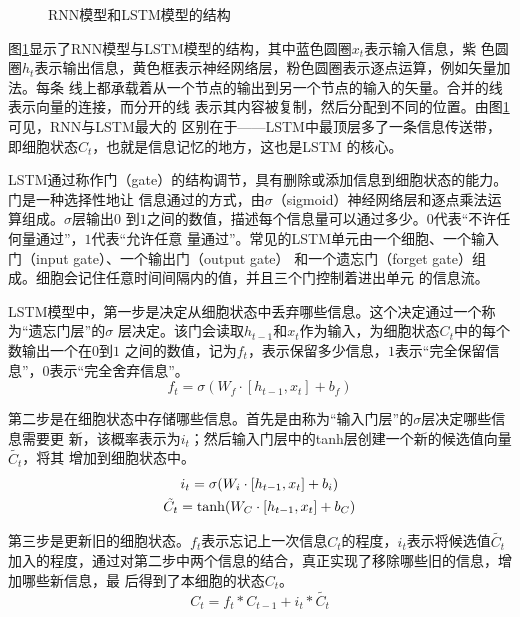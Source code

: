 \documentclass[lang=cn,11pt,a4paper,cite=authoryear]{elegantpaper}
\begin{document}
\begin{figure}[htp]
	\centering
    \caption{RNN模型和LSTM模型的结构}
	\label{fig:structure}
\end{figure}

图\ref{fig:structure}显示了RNN模型与LSTM模型的结构，其中蓝色圆圈$x_t$表示输入信息，紫
色圆圈$h_t$表示输出信息，黄色框表示神经网络层，粉色圆圈表示逐点运算，例如矢量加法。每条
线上都承载着从一个节点的输出到另一个节点的输入的矢量。合并的线表示向量的连接，而分开的线
表示其内容被复制，然后分配到不同的位置。由图\ref{fig:structure}可见，RNN与LSTM最大的
区别在于——LSTM中最顶层多了一条信息传送带，即细胞状态$C_t$，也就是信息记忆的地方，这也是LSTM
的核心。

LSTM通过称作门（gate）的结构调节，具有删除或添加信息到细胞状态的能力。门是一种选择性地让
信息通过的方式，由$\sigma$（sigmoid）神经网络层和逐点乘法运算组成。$\sigma$层输出$0$
到$1$之间的数值，描述每个信息量可以通过多少。$0$代表“不许任何量通过”，$1$代表“允许任意
量通过”。常见的LSTM单元由一个细胞、一个输入门（input gate）、一个输出门（output gate）
和一个遗忘门（forget gate）组成。细胞会记住任意时间间隔内的值，并且三个门控制着进出单元
的信息流。

LSTM模型中，第一步是决定从细胞状态中丢弃哪些信息。这个决定通过一个称为“遗忘门层”的$\sigma$
层决定。该门会读取$h_{t-1}$和$x_t$作为输入，为细胞状态$C_t$中的每个数输出一个在$0$到$1$
之间的数值，记为$f_t$，表示保留多少信息，$1$表示“完全保留信息”，$0$表示“完全舍弃信息”。
\begin{equation}
f_t=\sigma(W_{f} \cdot [h_{t-1},x_{t}]+b_{f})
\end{equation}

第二步是在细胞状态中存储哪些信息。首先是由称为“输入门层”的$\sigma$层决定哪些信息需要更
新，该概率表示为$i_t$；然后输入门层中的tanh层创建一个新的候选值向量$\tilde{C_t}$，将其
增加到细胞状态中。
\begin{gather}
i_t=\sigma(W_{i} \cdot [h_{t-1},x_{t}]+b_i) \\
\tilde{C_t}={\rm tanh}(W_{C} \cdot [h_{t-1},x_{t}]+b_C)
\end{gather}

第三步是更新旧的细胞状态。$f_t$表示忘记上一次信息$C_t$的程度，$i_t$表示将候选值$\tilde{C_t}$
加入的程度，通过对第二步中两个信息的结合，真正实现了移除哪些旧的信息，增加哪些新信息，最
后得到了本细胞的状态$C_t$。
\begin{equation}
C_t=f_t*C_{t-1}+i_t*\tilde{C_t}
\end{equation}
\end{document}
